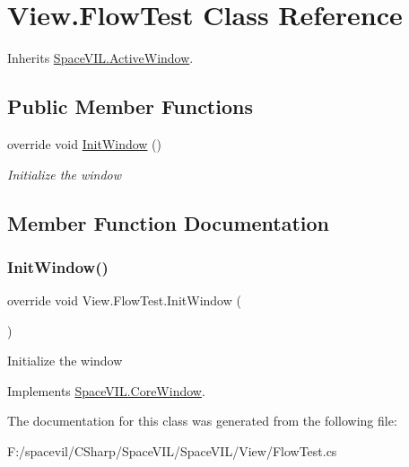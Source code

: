 \hypertarget{class_view_1_1_flow_test}{}\section{View.\+Flow\+Test Class Reference}
\label{class_view_1_1_flow_test}


Inherits \mbox{\hyperlink{class_space_v_i_l_1_1_active_window}{Space\+V\+I\+L.\+Active\+Window}}.

\subsection*{Public Member Functions}
\begin{DoxyCompactItemize}
\item 
override void \mbox{\hyperlink{class_view_1_1_flow_test_abf842c8c39e43a9d0e4b160b04084f90}{Init\+Window}} ()
\begin{DoxyCompactList}\small\item\em Initialize the window \end{DoxyCompactList}\end{DoxyCompactItemize}


\subsection{Member Function Documentation}
\mbox{\label{class_view_1_1_flow_test_abf842c8c39e43a9d0e4b160b04084f90}} 
\subsubsection{\texorpdfstring{Init\+Window()}{InitWindow()}}
{\footnotesize\ttfamily override void View.\+Flow\+Test.\+Init\+Window (\begin{DoxyParamCaption}{ }\end{DoxyParamCaption})\hspace{0.3cm}{\ttfamily [virtual]}}



Initialize the window 



Implements \mbox{\hyperlink{class_space_v_i_l_1_1_core_window_aa3cf4ac54d9651b1149584dc81042824}{Space\+V\+I\+L.\+Core\+Window}}.



The documentation for this class was generated from the following file\+:\begin{DoxyCompactItemize}
\item 
F\+:/spacevil/\+C\+Sharp/\+Space\+V\+I\+L/\+Space\+V\+I\+L/\+View/Flow\+Test.\+cs\end{DoxyCompactItemize}
